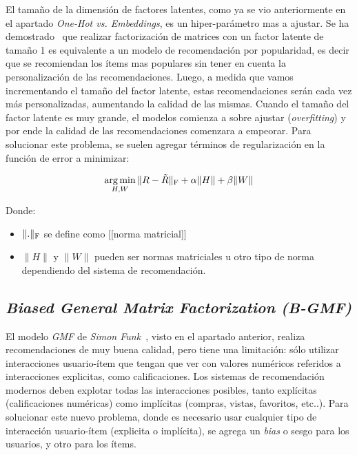 \documentclass[11pt,a4paper,twoside]{thesis}
\begin{document}
El tamaño de la dimensión de factores latentes, como ya se vio anteriormente en
el apartado \textit{One-Hot vs. Embeddings}, es un hiper-parámetro mas a
ajustar. Se ha demostrado~\cite{embeddingsizedem} que realizar factorización de
matrices con un factor latente de tamaño 1 es equivalente a un modelo de
recomendación por popularidad, es decir que se recomiendan los ítems mas
populares sin tener en cuenta la personalización de las recomendaciones. Luego,
a medida que vamos incrementando el tamaño del factor latente, estas
recomendaciones serán cada vez más personalizadas, aumentando la calidad de las
mismas. Cuando el tamaño del factor latente es muy grande, el modelos comienza
a sobre ajustar (\textit{overfitting}) y por ende la calidad de las
recomendaciones comenzara a empeorar. Para solucionar este problema, se suelen
agregar términos de regularización en la función de error a minimizar:

\begin{equation}
	\underset{H, W}{\operatorname{arg\,min } }\, \|R - \tilde{R}\|_{\rm F} + \alpha\|H\| + \beta\|W\|
\end{equation}
\begin{description}
	\item[Donde:]
\end{description}
\begin{itemize}
	\item $\|.\|_{\rm F}$ se define como [[norma matricial]]
	\item $\|H\|$ y $\|W\|$ pueden ser normas matriciales u otro tipo de norma dependiendo del sistema de recomendación.
\end{itemize}

\subsection{\textit{Biased General Matrix Factorization (B-GMF)}}

El modelo \textit{GMF} de \textit{Simon Funk}~\cite{afm, dlwkrs}, visto en el
apartado anterior, realiza recomendaciones de muy buena calidad, pero tiene una
limitación: sólo utilizar interacciones usuario-ítem que tengan que ver con
valores numéricos referidos a interacciones explicitas, como calificaciones.
Los sistemas de recomendación modernos deben explotar todas las interacciones
posibles, tanto explícitas (calificaciones numéricas) como implícitas (compras,
vistas, favoritos, etc..). Para solucionar este nuevo problema, donde es
necesario usar cualquier tipo de interacción usuario-ítem (explicita o
implícita), se agrega un \textit{bias} o sesgo para los usuarios, y otro para
los ítems.
\end{document}

